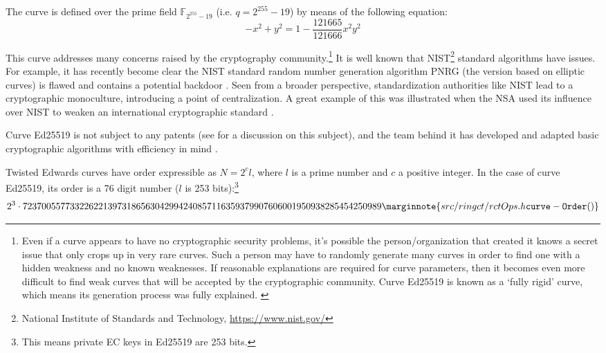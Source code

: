 The curve is defined over the prime field \(\mathbb{F}_{2^{255} - 19}\) (i.e. $q = 2^{255}-19$) by means of the following equation:\vspace{.175cm}
\[-x^2 + y^2 = 1 - \frac{121665}{121666} x^2 y^2\]

This curve addresses many concerns raised by the cryptography community.\footnote{Even if a curve appears to have no cryptographic security problems, it's possible the person/organization that created it knows a secret issue that only crops up in very rare curves. Such a person may have to randomly generate many curves in order to find one with a hidden weakness and no known weaknesses. If reasonable explanations are required for curve parameters, then it becomes even more difficult to find weak curves that will be accepted by the cryptographic community. Curve Ed25519 is known as a `fully rigid' curve, which means its generation process was fully explained. \cite{elliptic-curve-rigidity}} It is well known that NIST\footnote{\label{NIST_note}National Institute of Standards and Technology, \url{https://www.nist.gov/}} 
standard algorithms have issues. For example, it has recently become clear the NIST standard random number generation algorithm PNRG (the version based on elliptic curves) is flawed and contains a potential backdoor \cite{hales2014nsa}. Seen from a broader perspective, standardization authorities like NIST lead to a cryptographic monoculture, introducing a point of centralization. A great example of this was illustrated when the NSA used its influence over NIST to weaken an international cryptographic standard \cite{NSA-NIST}.

Curve Ed25519 is not subject to any patents (see \cite{ECC-patents} for a discussion on this subject), and the team behind it has
developed and adapted basic cryptographic algorithms with efficiency in mind \cite{Bernstein2007}.

Twisted Edwards curves have order expressible as \(N=2^c l\), where \(l\) is a prime number and \(c\) a positive integer. In the case of curve Ed25519, its order is a 76 digit number ($l$ is 253 bits):\footnote{This means private EC keys in Ed25519 are 253 bits.}\vspace{.175cm}
\[2^3 \cdot 7237005577332262213973186563042994240857116359379907606001950938285454250989\marginnote{src/ringct/ rctOps.h {\tt curve- Order()}}\]


